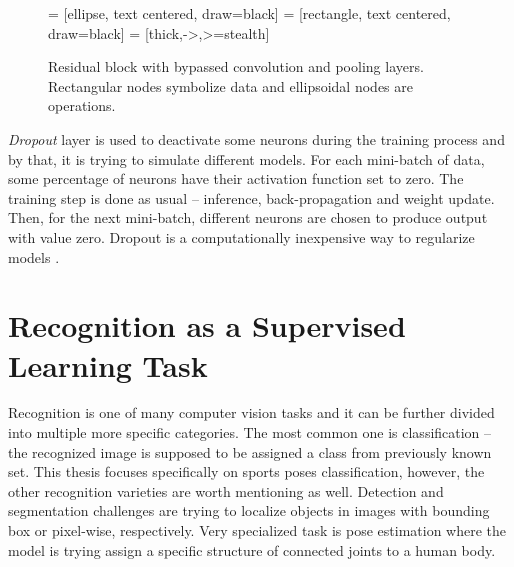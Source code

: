 \begin{figure*}[ht!]
    \centering
    
     = [ellipse, text centered, draw=black]
     = [rectangle, text centered, draw=black]
     = [thick,->,>=stealth]

    
    \caption{Residual block with bypassed convolution and pooling layers. Rectangular nodes symbolize data and ellipsoidal nodes are operations.}
    \label{fig:residual}
\end{figure*}

\textit{Dropout} layer is used to deactivate some neurons during the training process and by that, it is trying to simulate different models. For each mini-batch of data, some percentage of neurons have their activation function set to zero. The training step is done as usual -- inference, back-propagation and weight update. Then, for the next mini-batch, different neurons are chosen to produce output with value zero. Dropout is a computationally inexpensive way to regularize models \cite{Goodfellow-et-al-2016}.

\section{\label{sec:supervised}Recognition as a Supervised Learning Task}

Recognition is one of many computer vision tasks and it can be further divided into multiple more specific categories. The most common one is classification -- the recognized image is supposed to be assigned a class from previously known set. This thesis focuses specifically on sports poses classification, however, the other recognition varieties are worth mentioning as well. Detection and segmentation challenges are trying to localize objects in images with bounding box or pixel-wise, respectively. Very specialized task is pose estimation where the model is trying assign a specific structure of connected joints to a human body.

